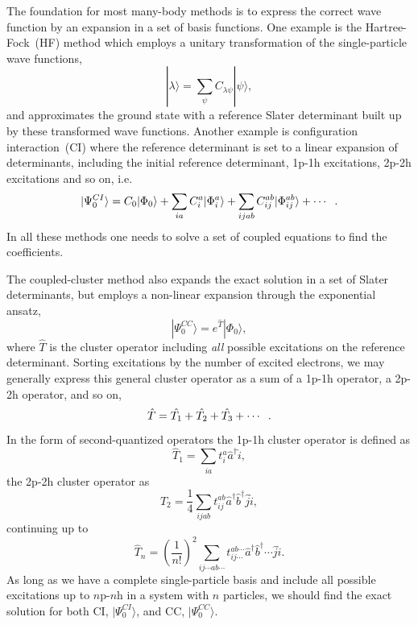 \documentclass[aps,twocolumn,showpacs,floatfix,nofootinbib,preprintnumbers,superscriptaddress,amsmath,amssymb]{revtex4-1}
\begin{document}
The foundation for most many-body methods is to express the correct
wave function by an expansion in a set of basis functions.  One
example is the Hartree-Fock~(HF) method which employs a unitary
transformation of the single-particle wave functions,
\begin{equation}
|\lambda \rangle = \sum_{\psi} C_{\lambda \psi} |\psi \rangle ,
\end{equation}
and approximates the ground state with a reference Slater determinant
built up by these transformed wave functions.  Another example is
configuration interaction~(CI) where the reference determinant is set
to a linear expansion of determinants, including the initial reference
determinant, 1p-1h excitations, 2p-2h excitations and so on, i.e.
\begin{equation}
|\Psi_{0}^{CI} \rangle = C_0 |\Phi_0 \rangle + \sum_{ia} C_i^a
|\Phi_i^a\rangle + \sum_{ijab} C_{ij}^{ab} |\Phi_{ij}^{ab} \rangle +
\cdots \hspace{2mm}.
\end{equation}
In all these methods one needs to solve a set of coupled equations to
find the coefficients.

The coupled-cluster method also expands the exact solution in a set of
Slater determinants, but employs a non-linear expansion through the
exponential ansatz,
\begin{equation}
\label{eq:CC:expon}
|\Psi_0^{CC} \rangle = e^{\hat{T}} |\Phi_0 \rangle ,
\end{equation}
where $\hat{T}$ is the cluster operator including \textit{all}
possible excitations on the reference determinant.  Sorting
excitations by the number of excited electrons, we may generally
express this general cluster operator as a sum of a 1p-1h operator, a
2p-2h operator, and so on,
\begin{equation}
\hat{T} = \hat{T_1} + \hat{T_2} + \hat{T_3} + \cdots \hspace{2mm}.
\end{equation}
In the form of second-quantized operators the 1p-1h cluster operator
is defined as
\begin{equation}
\hat{T}_1 = \sum_{ia} t_i^a \hat{a}^{\dagger} \hat{i},
\end{equation}
the 2p-2h cluster operator as
\begin{equation}
\hat{T}_2 = \frac{1}{4} \sum_{ijab} t_{ij}^{ab} \hat{a}^{\dagger}
\hat{b}^{\dagger} \hat{j} \hat{i},
\end{equation}
continuing up to
\begin{equation}
\hat{T}_n = \left( \frac{1}{n!}\right)^2 \sum_{ij\cdots ab\cdots}
t_{ij\cdots}^{ab\cdots} \hat{a}^{\dagger} \hat{b}^{\dagger} \cdots
\hat{j} \hat{i} .
\end{equation}
As long as we have a complete single-particle basis and include all
possible excitations up to $n$p-$n$h in a system with $n$ particles,
we should find the exact solution for both CI, $|\Psi_0^{CI}\rangle$,
and CC, $|\Psi_0^{CC}\rangle$.
\end{document}
